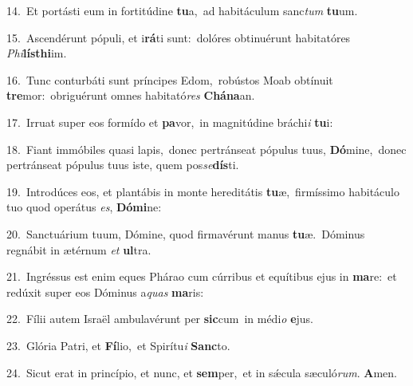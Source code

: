 {\numbfont\textcolor{\numbcolor}{14.}}~Et portásti eum in fortitúdine \textbf{tu}\-a,~\star ad habitáculum sanc\textit{tum} \textbf{tu}\-um.\par
{\numbfont\textcolor{\numbcolor}{15.}}~Ascendérunt pópuli, et i\-\textbf{rá}\-ti sunt:~\star dolóres obtinuérunt habitatóres \textit{Phi}\-\textbf{lís}\textbf{thi}im.\par
{\numbfont\textcolor{\numbcolor}{16.}}~Tunc conturbáti sunt príncipes Edom,~\dagger robústos Moab obtínuit \textbf{tre}\-mor:~\star obriguérunt omnes habitató\textit{res} \textbf{Chá}\-\textbf{na}an.\par
{\numbfont\textcolor{\numbcolor}{17.}}~Irruat super eos formído et \textbf{pa}\-vor,~\star in magnitúdine bráchi\textit{i} \textbf{tu}\-i:\par
{\numbfont\textcolor{\numbcolor}{18.}}~Fiant immóbiles quasi lapis,~\dagger donec pertránseat pópulus tuus, \textbf{Dó}\-mine,~\star donec pertránseat pópulus tuus iste, quem pos\-\textit{se}\-\textbf{dís}ti.\par
{\numbfont\textcolor{\numbcolor}{19.}}~Introdúces eos, et plantábis in monte hereditátis \textbf{tu}\-æ,~\star firmíssimo habitáculo tuo quod operátus \textit{es}\-, \textbf{Dó}\-\textbf{mi}ne:\par
{\numbfont\textcolor{\numbcolor}{20.}}~Sanctuárium tuum, Dómine, quod firmavérunt manus \textbf{tu}\-æ.~\star Dóminus regnábit in ætérnum \textit{et} \textbf{ul}\-tra.\par
{\numbfont\textcolor{\numbcolor}{21.}}~Ingréssus est enim eques Phárao cum cúrribus et equítibus ejus in \textbf{ma}\-re:~\star et redúxit super eos Dóminus a\textit{quas} \textbf{ma}\-ris:\par
{\numbfont\textcolor{\numbcolor}{22.}}~Fílii autem Israël ambulavérunt per \textbf{sic}\-cum~\star in médi\textit{o} \textbf{e}\-jus.\par
{\numbfont\textcolor{\numbcolor}{23.}}~Glória Patri, et \textbf{Fí}\-lio,~\star et Spirítu\textit{i} \textbf{Sanc}\-to.\par
{\numbfont\textcolor{\numbcolor}{24.}}~Sicut erat in princípio, et nunc, et \textbf{sem}\-per,~\star et in sǽcula sæculó\-\textit{rum}\-. \textbf{A}\-men.\par
